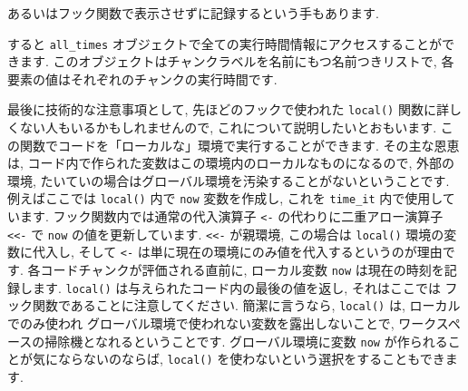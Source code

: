 \documentclass[
  11pt,
]{bxjsreport}
\newenvironment{Shaded}{\begin{snugshade}}{\end{snugshade}}
\newcommand{\AttributeTok}[1]{\textcolor[rgb]{0.77,0.63,0.00}{#1}}
\newcommand{\CommentTok}[1]{\textcolor[rgb]{0.56,0.35,0.01}{\textit{#1}}}
\newcommand{\ConstantTok}[1]{\textcolor[rgb]{0.00,0.00,0.00}{#1}}
\newcommand{\ControlFlowTok}[1]{\textcolor[rgb]{0.13,0.29,0.53}{\textbf{#1}}}
\newcommand{\FunctionTok}[1]{\textcolor[rgb]{0.00,0.00,0.00}{#1}}
\newcommand{\NormalTok}[1]{#1}
\newcommand{\OtherTok}[1]{\textcolor[rgb]{0.56,0.35,0.01}{#1}}
\newcommand{\SpecialCharTok}[1]{\textcolor[rgb]{0.00,0.00,0.00}{#1}}
\newcommand{\StringTok}[1]{\textcolor[rgb]{0.31,0.60,0.02}{#1}}
\begin{document}
\begin{Shaded}
\end{Shaded}

あるいはフック関数で表示させずに記録するという手もあります.

\begin{Shaded}
\end{Shaded}

すると \texttt{all\_times} オブジェクトで全ての実行時間情報にアクセスすることができます. このオブジェクトはチャンクラベルを名前にもつ名前つきリストで, 各要素の値はそれぞれのチャンクの実行時間です.

最後に技術的な注意事項として, 先ほどのフックで使われた \texttt{local()} 関数に詳しくない人もいるかもしれませんので, これについて説明したいとおもいます. この関数でコードを「ローカルな」環境で実行することができます. その主な恩恵は, コード内で作られた変数はこの環境内のローカルなものになるので, 外部の環境, たいていの場合はグローバル環境を汚染することがないということです. 例えばここでは \texttt{local()} 内で \texttt{now} 変数を作成し, これを \texttt{time\_it} 内で使用しています. フック関数内では通常の代入演算子 \texttt{\textless{}-} の代わりに二重アロー演算子 \texttt{\textless{}\textless{}-} で \texttt{now} の値を更新しています. \texttt{\textless{}\textless{}-} が親環境, この場合は \texttt{local()} 環境の変数に代入し, そして \texttt{\textless{}-} は単に現在の環境にのみ値を代入するというのが理由です. 各コードチャンクが評価される直前に, ローカル変数 \texttt{now} は現在の時刻を記録します. \texttt{local()} は与えられたコード内の最後の値を返し, それはここでは フック関数であることに注意してください. 簡潔に言うなら, \texttt{local()} は, ローカルでのみ使われ グローバル環境で使われない変数を露出しないことで, ワークスペースの掃除機となれるということです. グローバル環境に変数 \texttt{now} が作られることが気にならないのならば, \texttt{local()} を使わないという選択をすることもできます.
\end{document}
